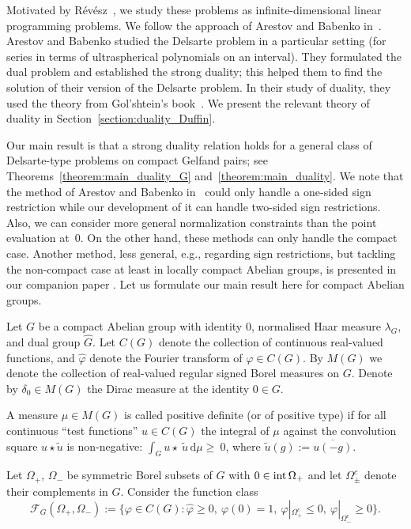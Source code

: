 \documentclass[[a4paper,english,12pt]{amsart}
\theoremstyle{plain}
\theoremstyle{remark}
\newcommand{\intt}{\mbox{\rm int\,}}
\begin{document}
Motivated by R\'ev\'esz~\cite{revesz}, we study these problems as infinite-dimensional linear programming problems. We follow the approach of Arestov and Babenko in~\cite{AB}. Arestov and Babenko studied the Delsarte problem in a particular setting (for series in terms of ultraspherical polynomials on an interval). They formulated the dual problem and established the strong duality; this helped them to find the solution of their version of the Delsarte problem. In their study of duality, they used the theory from Gol'shtein's book~\cite{golstein}. We present the relevant theory of duality in Section~\ref{section:duality_Duffin}.

Our main result is that a strong duality relation holds for a general class of Delsarte-type problems on compact Gelfand pairs; see Theorems~\ref{theorem:main_duality_G} and~\ref{theorem:main_duality}. We note that the method of Arestov and Babenko in~\cite{AB} could only handle a one-sided sign restriction while our development of it can handle two-sided sign restrictions.  Also, we can consider more general normalization constraints than the point evaluation at~$0$. On the other hand, these methods can only handle the compact case. Another method, less general, e.g., regarding sign restrictions, but tackling the non-compact case at least in locally compact Abelian groups, is presented in our companion paper \cite{C-paper}. Let us formulate our main result here for compact Abelian groups.

 Let $G$ be a compact Abelian group with identity $0$, normalised Haar measure $\lambda_G$, and dual group $\widehat{G}$. Let $C(G)$ denote the collection of continuous real-valued functions, and $\widehat{\varphi}$ denote the Fourier transform of $\varphi \in C(G)$. By $M(G)$ we denote the collection of real-valued regular signed Borel measures on $G$. Denote by $\delta_0 \in M(G)$ the Dirac measure at the identity $0 \in G$.

 A measure $\mu \in M(G)$ is called positive definite (or of positive type) if for all continuous ``test functions'' $u\in C(G)$ the integral of $\mu$ against the convolution square $u \star \widetilde{u}$ is non-negative: $\int_G u \star~ \widetilde{u} \,\mbox{d} \mu \ge~ 0$, where $\widetilde{u}(g) := \overline{u(-g)}$.
 
Let $\Omega_+$, $\Omega_-$ be symmetric Borel subsets of $G$ with $0 \in \intt{\Omega_+}$ and let $\Omega_{\pm}^c$ denote their complements in $G$. Consider the function class
$$
\mathcal{F}_G(\Omega_+, \Omega_-) := \{ \varphi \in C(G) : \widehat{\varphi} \ge 0, \ \varphi(0) = 1, \  \varphi|_{\Omega_+^c} \le 0, \  \varphi|_{\Omega_-^c} \ge 0 \}.
$$
\end{document}
